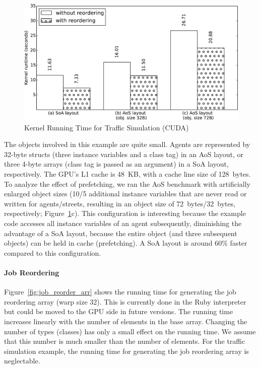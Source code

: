 \documentclass[preprint]{sigplanconf}
\begin{document}
\begin{figure}[!htp]
    \includegraphics[width=\columnwidth]{bench_1.pdf}
    \centering
    \caption{Kernel Running Time for Traffic Simulation (CUDA)}
    \label{fig:bench_kernel}
\end{figure}

The objects involved in this example are quite small. Agents are represented by 32-byte structs (three instance variables and a class tag) in an AoS layout, or three 4-byte arrays (class tag is passed as an argument) in a SoA layout, respectively. The GPU's L1 cache is 48~KB, with a cache line size of 128~bytes. To analyze the effect of prefetching, we ran the AoS benchmark with artificially enlarged object sizes (10/5 additional instance variables that are never read or written for agents/streets, resulting in an object size of 72~bytes/32~bytes, respectively; Figure~\ref{fig:bench_kernel}c). This configuration is interesting because the example code accesses all instance variables of an agent subsequently, diminishing the advantage of a SoA layout, because the entire object (and three subsequent objects) can be held in cache (prefetching). A SoA layout is around 60\% faster compared to this configuration.

\paragraph{Job Reordering}
Figure~\ref{fig:job_reorder_arr} shows the running time for generating the job reordering array (warp size 32). This is currently done in the Ruby interpreter but could be moved to the GPU side in future versions. The running time increases linearly with the number of elements in the base array. Changing the number of types (classes) has only a small effect on the running time. We assume that this number is much smaller than the number of elements. For the traffic simulation example, the running time for generating the job reordering array is neglectable.
\end{document}
